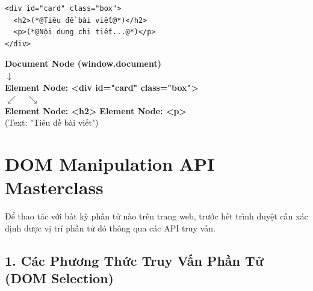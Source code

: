 \begin{codeWindow}
\begin{lstlisting}[language=HTML5]
<div id="card" class="box">
  <h2>(*@Tiêu đề bài viết@*)</h2>
  <p>(*@Nội dung chi tiết...@*)</p>
</div>
\end{lstlisting}
\end{codeWindow}

\begin{browserWindow}
\sffamily\small
\centering
\begin{tcolorbox}[colback=primaryBlue!4, colframe=primaryBlue!30, width=0.85\linewidth, arc=5pt]
\centering
\textbf{\color{primaryBlue} Document Node (window.document)}\\[4pt]
$\downarrow$\\[4pt]
\textbf{\color{primaryBlue} Element Node: <div id="card" class="box">}\\[4pt]
$\swarrow \quad \searrow$\\[4pt]
\textbf{Element Node: <h2>} \qquad\qquad \textbf{Element Node: <p>}\\[2pt]
{\small (Text: "Tiêu đề bài viết")} \qquad{}
\end{tcolorbox}
\end{browserWindow}

\section{DOM Manipulation API Masterclass}

Để thao tác với bất kỳ phần tử nào trên trang web, trước hết trình duyệt cần xác định được vị trí phần tử đó thông qua các API truy vấn.

\subsection{1. Các Phương Thức Truy Vấn Phần Tử (DOM Selection)}

